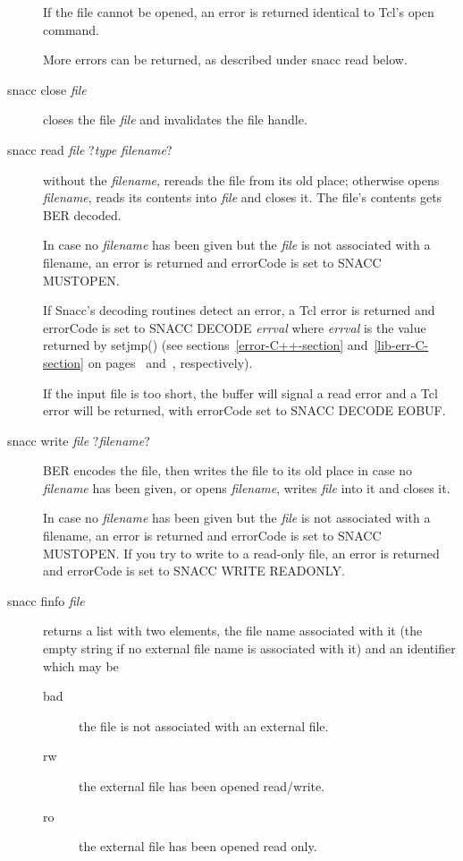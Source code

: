 \begin{description}
    If the file cannot be opened, an error is returned identical to Tcl's {\Tcl open} command.

    More errors can be returned, as described under {\Tcl snacc read} below.

  \item[{\Tcl snacc close \emph{file}}]
    closes the file \emph{file} and invalidates the file handle.

  \item[{\Tcl snacc read \emph{file} ?\emph{type filename}?}]
    without the \emph{filename}, rereads the file from its old place; otherwise opens \emph{filename}, reads its contents into \emph{file} and closes it.
    The file's contents gets BER decoded.

    In case no \emph{filename} has been given but the \emph{file} is not associated with a filename, an error is returned and {\Tcl errorCode} is set to {\Tcl SNACC MUSTOPEN}.

    If Snacc's decoding routines detect an error, a Tcl error is returned and {\Tcl errorCode} is set to {\Tcl SNACC DECODE \emph{errval}} where \emph{errval} is the value returned by {\C setjmp()} (see sections~\ref{error-C++-section} and~\ref{lib-err-C-section} on pages~\pageref{error-C++-section} and~\pageref{lib-err-C-section}, respectively).

    If the input file is too short, the buffer will signal a read error and a Tcl error will be returned, with {\Tcl errorCode} set to {\Tcl SNACC DECODE EOBUF}.

  \item[{\Tcl snacc write \emph{file} ?\emph{filename}?}]
    BER encodes the file, then writes the file to its old place in case no \emph{filename} has been given, or opens \emph{filename}, writes \emph{file} into it and closes it.

    In case no \emph{filename} has been given but the \emph{file} is not associated with a filename, an error is returned and {\Tcl errorCode} is set to {\Tcl SNACC MUSTOPEN}.
    If you try to write to a read-only file, an error is returned and {\Tcl errorCode} is set to {\Tcl SNACC WRITE READONLY}.

  \item[{\Tcl snacc finfo \emph{file}}]
    returns a list with two elements, the file name associated with it (the empty string if no external file name is associated with it) and an identifier which may be
    \begin{description}%
      \item[{\Tcl bad}] the file is not associated with an external file.
      \item[{\Tcl rw}] the external file has been opened read/write.
      \item[{\Tcl ro}] the external file has been opened read only.
    \end{description}%
\end{description}%

